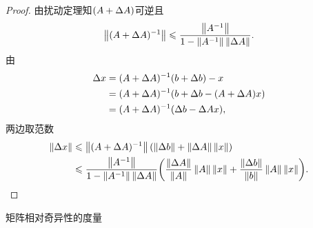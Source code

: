 \begin{proof}
    由扰动定理知$(A+\D A)$可逆且
    \begin{equation}
        \norm{(A+\D A)\iv}\leq\frac{\norm{A\iv}}{1-\norm{A\iv}\norm{\D A}}.
    \end{equation}
    由
    \begin{align*}
        \D x&=(A+\D A)\iv(b+\D b)-x\\
        &=(A+\D A)\iv(b+\D b-(A+\D A)x)\\
        &=(A+\D A)\iv(\D b-\D Ax),
    \end{align*}
    两边取范数
    \begin{align*}
        \norm{\D x}&\leq\norm{(A+\D A)\iv}(\norm{\D b}+\norm{\D A}\norm x)\\
        &\leq\frac{\norm{A\iv}}{1-\norm{A\iv}\norm{\D A}}\biggkh{\frac{\norm{\D A}}{\norm A}\norm A\norm x+\frac{\norm{\D b}}{\norm b}\norm A\norm x}.
        \qedhere
    \end{align*}
\end{proof}

\begin{theorem}
    {矩阵相对奇异性的度量}{}
     
\end{theorem}
